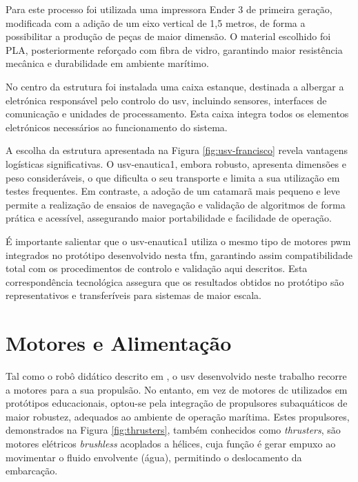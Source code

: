 Para este processo foi utilizada uma impressora Ender 3 de primeira geração, modificada com a adição de um eixo vertical de 1,5 metros, de forma a possibilitar a produção de peças de maior dimensão. O material escolhido foi PLA, posteriormente reforçado com fibra de vidro, garantindo maior resistência mecânica e durabilidade em ambiente marítimo. 

No centro da estrutura foi instalada uma caixa estanque, destinada a albergar a eletrónica responsável pelo controlo do \gls{usv}, incluindo sensores, interfaces de comunicação e unidades de processamento. Esta caixa integra todos os elementos eletrónicos necessários ao funcionamento do sistema. 

A escolha da estrutura apresentada na Figura \ref{fig:usv-francisco} revela vantagens logísticas significativas. O \gls{usv}-enautica1, embora robusto, apresenta dimensões e peso consideráveis, o que dificulta o seu transporte e limita a sua utilização em testes frequentes. Em contraste, a adoção de um catamarã mais pequeno e leve permite a realização de ensaios de navegação e validação de algoritmos de forma prática e acessível, assegurando maior portabilidade e facilidade de operação.  

É importante salientar que o \gls{usv}-enautica1 utiliza o mesmo tipo de motores \gls{pwm} integrados no protótipo desenvolvido nesta \gls{tfm}, garantindo assim compatibilidade total com os procedimentos de controlo e validação aqui descritos. Esta correspondência tecnológica assegura que os resultados obtidos no protótipo são representativos e transferíveis para sistemas de maior escala.

\section{Motores e Alimentação}
\label{sec:motor}

Tal como o robô didático descrito em \cite{didactic-robot-thesis}, o \gls{usv} desenvolvido neste trabalho recorre a motores para a sua propulsão. No entanto, em vez de motores \gls{dc} utilizados em protótipos educacionais, optou-se pela integração de propulsores subaquáticos de maior robustez, adequados ao ambiente de operação marítima. Estes propulsores, demonstrados na Figura \ref{fig:thrusters}, também conhecidos como \emph{thrusters}, são motores elétricos \emph{brushless} acoplados a hélices, cuja função é gerar empuxo ao movimentar o fluido envolvente (água), permitindo o deslocamento da embarcação.

